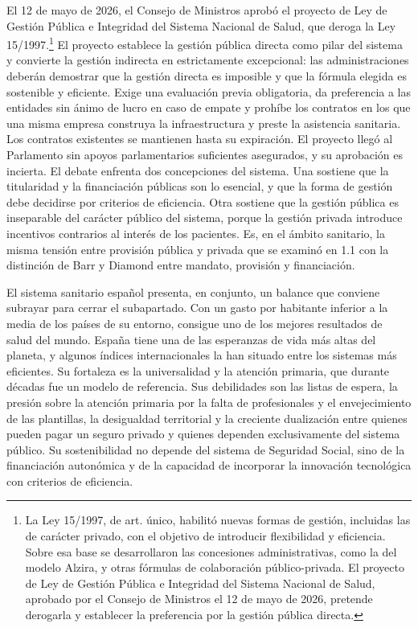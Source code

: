 \documentclass[10pt,a4paper]{article}
\begin{document}
El 12 de mayo de 2026, el Consejo de Ministros aprobó el proyecto de Ley de Gestión Pública e Integridad del Sistema Nacional de Salud, que deroga la Ley 15/1997.\footnote{La Ley 15/1997, de art. único, habilitó nuevas formas de gestión, incluidas las de carácter privado, con el objetivo de introducir flexibilidad y eficiencia. Sobre esa base se desarrollaron las concesiones administrativas, como la del modelo Alzira, y otras fórmulas de colaboración público-privada. El proyecto de Ley de Gestión Pública e Integridad del Sistema Nacional de Salud, aprobado por el Consejo de Ministros el 12 de mayo de 2026, pretende derogarla y establecer la preferencia por la gestión pública directa.
} El proyecto establece la gestión pública directa como pilar del sistema y convierte la gestión indirecta en estrictamente excepcional: las administraciones deberán demostrar que la gestión directa es imposible y que la fórmula elegida es sostenible y eficiente. Exige una evaluación previa obligatoria, da preferencia a las entidades sin ánimo de lucro en caso de empate y prohíbe los contratos en los que una misma empresa construya la infraestructura y preste la asistencia sanitaria. Los contratos existentes se mantienen hasta su expiración. El proyecto llegó al Parlamento sin apoyos parlamentarios suficientes asegurados, y su aprobación es incierta. El debate enfrenta dos concepciones del sistema. Una sostiene que la titularidad y la financiación públicas son lo esencial, y que la forma de gestión debe decidirse por criterios de eficiencia. Otra sostiene que la gestión pública es inseparable del carácter público del sistema, porque la gestión privada introduce incentivos contrarios al interés de los pacientes. Es, en el ámbito sanitario, la misma tensión entre provisión pública y privada que se examinó en 1.1 con la distinción de Barr y Diamond entre mandato, provisión y financiación.

El sistema sanitario español presenta, en conjunto, un balance que conviene subrayar para cerrar el subapartado. Con un gasto por habitante inferior a la media de los países de su entorno, consigue uno de los mejores resultados de salud del mundo. España tiene una de las esperanzas de vida más altas del planeta, y algunos índices internacionales la han situado entre los sistemas más eficientes. Su fortaleza es la universalidad y la atención primaria, que durante décadas fue un modelo de referencia. Sus debilidades son las listas de espera, la presión sobre la atención primaria por la falta de profesionales y el envejecimiento de las plantillas, la desigualdad territorial y la creciente dualización entre quienes pueden pagar un seguro privado y quienes dependen exclusivamente del sistema público. Su sostenibilidad no depende del sistema de Seguridad Social, sino de la financiación autonómica y de la capacidad de incorporar la innovación tecnológica con criterios de eficiencia.
\end{document}
